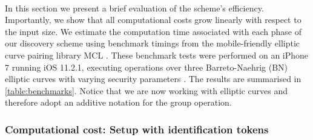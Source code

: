 	\paragraph{} In this section we present a brief evaluation of the scheme's efficiency. Importantly, we show that all computational costs grow linearly with respect to the input size. We estimate the computation time associated with each phase of our discovery scheme using benchmark timings from the mobile-friendly elliptic curve pairing library MCL \cite{MCLLib}. These benchmark tests were performed on an iPhone 7 running iOS 11.2.1, executing operations over three Barreto-Naehrig (BN) elliptic curves with varying security parameters \cite{MCLBench}. The results are summarised in \autoref{table:benchmarks}. Notice that we are now working with elliptic curves and therefore adopt an additive notation for the group operation.
	
	
	
	
	\subsubsection{Computational cost: Setup with identification tokens}
	
